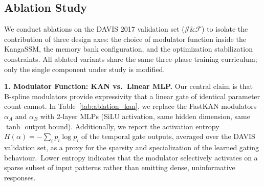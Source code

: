 \documentclass[sigconf]{acmart}
\begin{document}
\begin{table}[t]
\centering
\caption{VOS performance in the ultra-lightweight regime ($\leq$10M parameters) on DAVIS 2017 val and YouTube-VOS 2019 val. All models use MobileNetV2 backbone. \checkmark = uses BL30K pre-training.}
\label{tab:sota}
\end{table}

\subsection{Ablation Study}
\label{sec:ablation}
We conduct ablations on the DAVIS 2017 validation set ($\mathcal{J}\&\mathcal{F}$) to isolate the contribution of three design axes: the choice of modulator function inside the KangaSSM, the memory bank configuration, and the optimization stabilization constraints. All ablated variants share the same three-phase training curriculum; only the single component under study is modified.

\textbf{1. Modulator Function: KAN vs.\ Linear MLP.}
Our central claim is that B-spline modulators provide expressivity that a linear gate of identical parameter count cannot. In Table~\ref{tab:ablation_kan}, we replace the FastKAN modulators $\alpha_A$ and $\alpha_B$ with 2-layer MLPs (SiLU activation, same hidden dimension, same $\tanh$ output bound). Additionally, we report the activation entropy $H(\alpha) = -\sum_i p_i \log p_i$ of the temporal gate outputs, averaged over the DAVIS validation set, as a proxy for the sparsity and specialization of the learned gating behaviour.\footnotemark\, Lower entropy indicates that the modulator selectively activates on a sparse subset of input patterns rather than emitting dense, uninformative responses.
\end{document}

